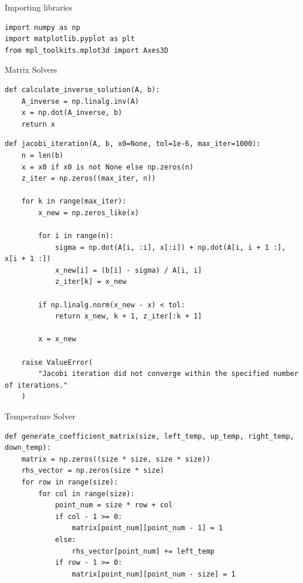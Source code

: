 \documentclass[aspectratio=169]{beamer}
\begin{document}
\begin{frame}[fragile]{Importing libraries}
\begin{lstlisting}[style=Python]
import numpy as np
import matplotlib.pyplot as plt
from mpl_toolkits.mplot3d import Axes3D
\end{lstlisting}
\end{frame}


\begin{frame}[fragile]{Matrix Solvers}
\begin{lstlisting}[style=Python]
def calculate_inverse_solution(A, b):
    A_inverse = np.linalg.inv(A)
    x = np.dot(A_inverse, b)
    return x
\end{lstlisting}
\end{frame}

\begin{frame}[fragile]
\begin{lstlisting}[style=Python]
def jacobi_iteration(A, b, x0=None, tol=1e-6, max_iter=1000):
    n = len(b)
    x = x0 if x0 is not None else np.zeros(n)
    z_iter = np.zeros((max_iter, n))

    for k in range(max_iter):
        x_new = np.zeros_like(x)

        for i in range(n):
            sigma = np.dot(A[i, :i], x[:i]) + np.dot(A[i, i + 1 :], x[i + 1 :])
            x_new[i] = (b[i] - sigma) / A[i, i]
            z_iter[k] = x_new

        if np.linalg.norm(x_new - x) < tol:
            return x_new, k + 1, z_iter[:k + 1]

        x = x_new

    raise ValueError(
        "Jacobi iteration did not converge within the specified number of iterations."
    )
\end{lstlisting}
\end{frame}

\begin{frame}[fragile]{Temperature Solver}
\begin{lstlisting}[style=Python]
def generate_coefficient_matrix(size, left_temp, up_temp, right_temp, down_temp):
    matrix = np.zeros((size * size, size * size))
    rhs_vector = np.zeros(size * size)
    for row in range(size):
        for col in range(size):
            point_num = size * row + col
            if col - 1 >= 0:
                matrix[point_num][point_num - 1] = 1
            else:
                rhs_vector[point_num] += left_temp
            if row - 1 >= 0:
                matrix[point_num][point_num - size] = 1
\end{lstlisting}
\end{frame}
\end{document}

